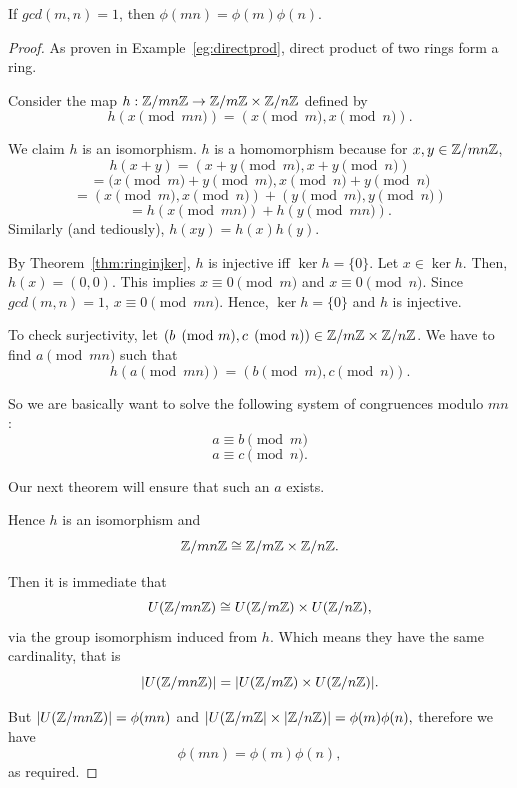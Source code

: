 \begin{theorem}\label{thm:mulphi}
    If $gcd(m,n) = 1$, then $\phi(mn) = \phi(m)\phi(n)$.
\end{theorem}
\begin{proof}
    As proven in Example~\ref{eg:directprod}, direct product of two rings form a ring.

    Consider the map $h: \mathbb{Z}/mn\mathbb{Z} \rightarrow \mathbb{Z}/m\mathbb{Z} \times \mathbb{Z}/n\mathbb{Z}$ defined by \[h(x \pmod{mn}) = (x \pmod{m}, x \pmod{n}).\]

    We claim $h$ is an isomorphism. $h$ is a homomorphism because for $x,y \in \mathbb{Z}/mn\mathbb{Z}$, \[h(x+y) = (x+y \pmod{m}, x+y \pmod{n})\] \[= (x \pmod{m} + y \pmod{m}, x \pmod{n} + y \pmod{n}\] \[= (x \pmod{m}, x \pmod{n}) + (y \pmod{m}, y \pmod{n})\] \[= h(x \pmod{mn}) + h(y \pmod{mn}).\] Similarly (and tediously), $h(xy) = h(x)h(y)$.

    By Theorem~\ref{thm:ringinjker}, $h$ is injective iff $\ker h = \{0\}$. Let $x \in \ker h$. Then, $h(x) = (0,0)$. This implies $x \equiv 0 \pmod{m}$ and $x \equiv 0 \pmod{n}$. Since $gcd(m,n) = 1$, $x \equiv 0 \pmod{mn}$. Hence, $\ker h = \{0\}$ and $h$ is injective.

    To check surjectivity, let $(b \pmod{m}, c \pmod{n}) \in \mathbb{Z}/m\mathbb{Z} \times \mathbb{Z}/n\mathbb{Z}$. We have to find $a \pmod{mn}$ such that \[h(a \pmod{mn}) = (b \pmod{m}, c \pmod{n}).\]

    So we are basically want to solve the following system of congruences modulo $mn$: \[a \equiv b \pmod{m}\] \[a \equiv c \pmod{n}.\]

    Our next theorem will ensure that such an $a$ exists.

    Hence $h$ is an isomorphism and \[\mathbb{Z}/mn\mathbb{Z} \cong \mathbb{Z}/m\mathbb{Z} \times \mathbb{Z}/n\mathbb{Z}.\] 
    
    Then it is immediate that \[U(\mathbb{Z}/mn\mathbb{Z}) \cong U(\mathbb{Z}/m\mathbb{Z}) \times U(\mathbb{Z}/n\mathbb{Z}),\] via the group isomorphism induced from $h$. Which means they have the same cardinality, that is \[|U(\mathbb{Z}/mn\mathbb{Z})| = |U(\mathbb{Z}/m\mathbb{Z}) \times U(\mathbb{Z}/n\mathbb{Z})|.\]

    But $|U(\mathbb{Z}/mn\mathbb{Z})| = \phi(mn)$ and $|U(\mathbb{Z}/m\mathbb{Z}| \times |\mathbb{Z}/n\mathbb{Z})| = \phi(m)\phi(n),$ therefore we have \[\phi(mn) = \phi(m)\phi(n),\] as required.
\end{proof}

